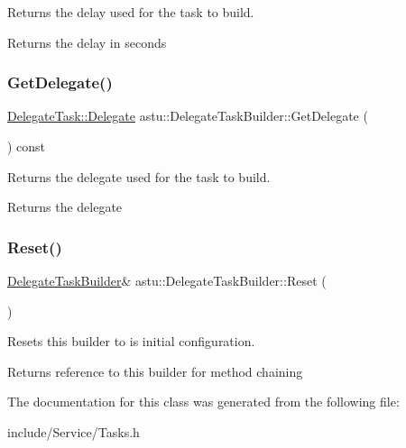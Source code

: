 Returns the delay used for the task to build.
\begin{DoxyItemize}
\item \begin{DoxyReturn}{Returns}
the delay in seconds 
\end{DoxyReturn}

\end{DoxyItemize}\mbox{\label{classastu_1_1DelegateTaskBuilder_abcbf0e7dbc8e4eed11a1214a266627ea}} 
\subsubsection{\texorpdfstring{Get\+Delegate()}{GetDelegate()}}
{\footnotesize\ttfamily \hyperlink{classastu_1_1DelegateTask_a74c7859178eb0889e884209d1604de4d}{Delegate\+Task\+::\+Delegate} astu\+::\+Delegate\+Task\+Builder\+::\+Get\+Delegate (\begin{DoxyParamCaption}{ }\end{DoxyParamCaption}) const\hspace{0.3cm}{\ttfamily [inline]}}

Returns the delegate used for the task to build.
\begin{DoxyItemize}
\item \begin{DoxyReturn}{Returns}
the delegate 
\end{DoxyReturn}

\end{DoxyItemize}\mbox{\label{classastu_1_1DelegateTaskBuilder_ad871e5e55e2d17fae9ae8503c179fc8f}} 
\subsubsection{\texorpdfstring{Reset()}{Reset()}}
{\footnotesize\ttfamily \hyperlink{classastu_1_1DelegateTaskBuilder}{Delegate\+Task\+Builder}\& astu\+::\+Delegate\+Task\+Builder\+::\+Reset (\begin{DoxyParamCaption}{ }\end{DoxyParamCaption})}

Resets this builder to is initial configuration.

\begin{DoxyReturn}{Returns}
reference to this builder for method chaining 
\end{DoxyReturn}


The documentation for this class was generated from the following file\+:\begin{DoxyCompactItemize}
\item 
include/\+Service/Tasks.\+h\end{DoxyCompactItemize}
